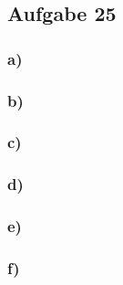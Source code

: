 \subsection*{Aufgabe 25}

\subsubsection*{a)}

\subsubsection*{b)}

\subsubsection*{c)}

\subsubsection*{d)}

\subsubsection*{e)}

\subsubsection*{f)}
